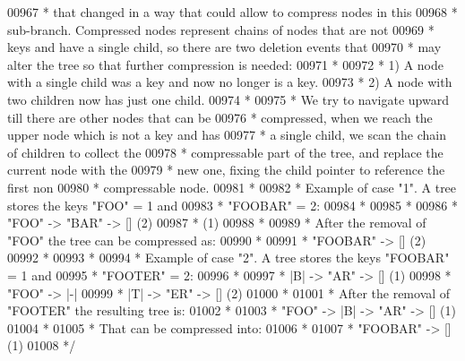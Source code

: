 \begin{DoxyCode}
{{{{{{{{{{{{{{{{00967 \textcolor{comment}{     * that changed in a way that could allow to compress nodes in this}
00968 \textcolor{comment}{     * sub-branch. Compressed nodes represent chains of nodes that are not}
00969 \textcolor{comment}{     * keys and have a single child, so there are two deletion events that}
00970 \textcolor{comment}{     * may alter the tree so that further compression is needed:}
00971 \textcolor{comment}{     *}
00972 \textcolor{comment}{     * 1) A node with a single child was a key and now no longer is a key.}
00973 \textcolor{comment}{     * 2) A node with two children now has just one child.}
00974 \textcolor{comment}{     *}
00975 \textcolor{comment}{     * We try to navigate upward till there are other nodes that can be}
00976 \textcolor{comment}{     * compressed, when we reach the upper node which is not a key and has}
00977 \textcolor{comment}{     * a single child, we scan the chain of children to collect the}
00978 \textcolor{comment}{     * compressable part of the tree, and replace the current node with the}
00979 \textcolor{comment}{     * new one, fixing the child pointer to reference the first non}
00980 \textcolor{comment}{     * compressable node.}
00981 \textcolor{comment}{     *}
00982 \textcolor{comment}{     * Example of case "1". A tree stores the keys "FOO" = 1 and}
00983 \textcolor{comment}{     * "FOOBAR" = 2:}
00984 \textcolor{comment}{     *}
00985 \textcolor{comment}{     *}
00986 \textcolor{comment}{     * "FOO" -> "BAR" -> [] (2)}
00987 \textcolor{comment}{     *           (1)}
00988 \textcolor{comment}{     *}
00989 \textcolor{comment}{     * After the removal of "FOO" the tree can be compressed as:}
00990 \textcolor{comment}{     *}
00991 \textcolor{comment}{     * "FOOBAR" -> [] (2)}
00992 \textcolor{comment}{     *}
00993 \textcolor{comment}{     *}
00994 \textcolor{comment}{     * Example of case "2". A tree stores the keys "FOOBAR" = 1 and}
00995 \textcolor{comment}{     * "FOOTER" = 2:}
00996 \textcolor{comment}{     *}
00997 \textcolor{comment}{     *          |B| -> "AR" -> [] (1)}
00998 \textcolor{comment}{     * "FOO" -> |-|}
00999 \textcolor{comment}{     *          |T| -> "ER" -> [] (2)}
01000 \textcolor{comment}{     *}
01001 \textcolor{comment}{     * After the removal of "FOOTER" the resulting tree is:}
01002 \textcolor{comment}{     *}
01003 \textcolor{comment}{     * "FOO" -> |B| -> "AR" -> [] (1)}
01004 \textcolor{comment}{     *}
01005 \textcolor{comment}{     * That can be compressed into:}
01006 \textcolor{comment}{     *}
01007 \textcolor{comment}{     * "FOOBAR" -> [] (1)}
01008 \textcolor{comment}{     */}
}}}}}}}}}}}}}}}}
\end{DoxyCode}
